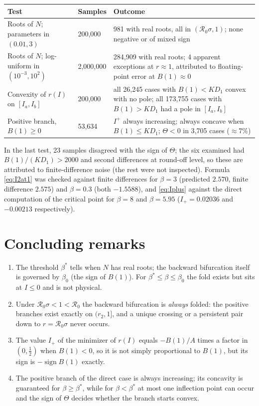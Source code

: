 \documentclass[11pt]{article}
\theoremstyle{remark}
\newcommand{\R}{\mathcal R_0}
\begin{document}
\begin{center}
\begin{tabular}{p{5.2cm}p{2.0cm}p{6.2cm}}
\toprule
Test & Samples & Outcome\\
\midrule
Roots of $N$; parameters in $(0.01,3)$ & 200{,}000 & 981 with real roots, all in $(\R\sigma,1)$; none negative or of mixed sign\\
Roots of $N$; log-uniform in $(10^{-3},10^2)$ & 2{,}000{,}000 & 284{,}909 with real roots; 4 apparent exceptions at $r\approx1$, attributed to floating-point error at $B(1)\approx0$\\
Convexity of $r(I)$ on $[I_a,I_b]$ & 200{,}000 & all 26{,}245 cases with $B(1)<KD_1$ convex with no pole; all 173{,}755 cases with $B(1)>KD_1$ had a pole in $[I_a,I_b]$\\
Positive branch, $B(1)\ge0$ & 53{,}634 & $I^+$ always increasing; always concave when $B(1)\le KD_1$; $\Theta<0$ in 3{,}705 cases ($\approx7\%$)\\
\bottomrule
\end{tabular}
\end{center}
In the last test, 23 samples disagreed with the sign of $\Theta$; the six examined had $B(1)/(KD_1)>2000$ and second differences at round-off level, so these are attributed to finite-difference noise (the rest were not inspected). Formula \eqref{eq:I2at1} was checked against finite differences for $\beta=3$ (predicted $2.570$, finite difference $2.575$) and $\beta=0.3$ (both $-1.5588$), and \eqref{eq:Iplus} against the direct computation of the critical point for $\beta=8$ and $\beta=5.95$ ($I_+=0.02036$ and $-0.00213$ respectively).

\section{Concluding remarks}\label{sec:concl}

\begin{enumerate}
\item The threshold $\beta^*$ tells when $N$ has real roots; the backward bifurcation itself is governed by $\beta_0$ (the sign of $B(1)$). For $\beta^*\le\beta\le\beta_0$ the fold exists but sits at $I\le0$ and is not physical.
\item Under $\R\sigma<1<\R$ the backward bifurcation is \emph{always} folded: the positive branches exist exactly on $(r_2,1]$, and a unique crossing or a persistent pair down to $r=\R\sigma$ never occurs.
\item The value $I_+$ of the minimizer of $r(I)$ equals $-B(1)/A$ times a factor in $(0,\tfrac12)$ when $B(1)<0$, so it is not simply proportional to $B(1)$, but its sign is $-\operatorname{sign}B(1)$ exactly.
\item The positive branch of the direct case is always increasing; its concavity is guaranteed for $\beta\ge\beta^*$, while for $\beta<\beta^*$ at most one inflection point can occur and the sign of $\Theta$ decides whether the branch starts convex.
\end{enumerate}
\end{document}
